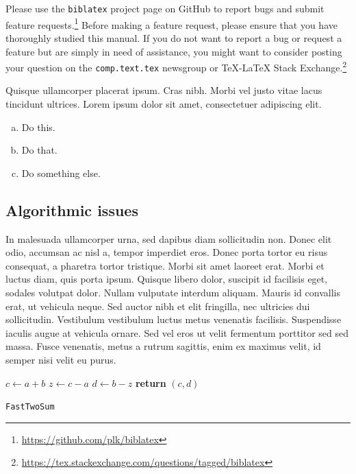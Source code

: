 \documentclass{article}
\begin{document}
Please use the \texttt{biblatex} project page on GitHub to report bugs and submit feature requests.\footnote{\url{https://github.com/plk/biblatex}} Before making a feature request, please ensure that you have thoroughly studied this manual. If you do not want to report a bug or request a feature but are simply in need of assistance, you might want to consider posting your question on the \texttt{comp.text.tex} newsgroup or TeX-LaTeX Stack Exchange.\footnote{\url{https://tex.stackexchange.com/questions/tagged/biblatex}}
\begin{question}
	Quisque ullamcorper placerat ipsum. Cras nibh. Morbi vel justo vitae lacus tincidunt ultrices. Lorem ipsum dolor sit amet, consectetuer adipiscing elit.

	\begin{enumerate}[(a)]
		\item Do this.
		\item Do that.
		\item Do something else.
	\end{enumerate}
\end{question}
	

\subsection{Algorithmic issues}

In malesuada ullamcorper urna, sed dapibus diam sollicitudin non. Donec elit odio, accumsan ac nisl a, tempor imperdiet eros. Donec porta tortor eu risus consequat, a pharetra tortor tristique. Morbi sit amet laoreet erat. Morbi et luctus diam, quis porta ipsum. Quisque libero dolor, suscipit id facilisis eget, sodales volutpat dolor. Nullam vulputate interdum aliquam. Mauris id convallis erat, ut vehicula neque. Sed auctor nibh et elit fringilla, nec ultricies dui sollicitudin. Vestibulum vestibulum luctus metus venenatis facilisis. Suspendisse iaculis augue at vehicula ornare. Sed vel eros ut velit fermentum porttitor sed sed massa. Fusce venenatis, metus a rutrum sagittis, enim ex maximus velit, id semper nisi velit eu purus.

\begin{center}
	\begin{minipage}{0.5\linewidth} %
		\begin{algorithm}[H]
			\medskip
			$c \leftarrow a + b$ \;
			$z \leftarrow c - a$ \;
			$d \leftarrow b - z$ \;
			{\bf return} $(c,d)$ \;
			\caption{\texttt{FastTwoSum}} %
			\label{alg:fastTwoSum}   %
		\end{algorithm}
	\end{minipage}
\end{center}
\end{document}
